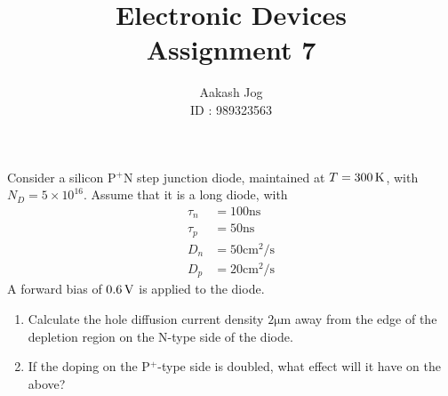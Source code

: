 \documentclass[fleqn, a4paper, 10pt, oneside]{amsart}
\title
[
	Electronic Devices : Assignment 7
]
{
	Electronic Devices\\
	Assignment 7
}
\author
{
	Aakash Jog\\
	ID : 989323563
}
\date{\formatdate{5}{5}{2016}}
\theoremstyle{definition}
\theoremstyle{theorem}
\begin{document}
\maketitle

\begin{question}
	Consider a silicon P$^+$N step junction diode, maintained at $T = 300 \kelvin$, with $N_D = 5 \times 10^{16}$.
	Assume that it is a long diode, with
	\begin{align*}
		\tau_n & = 100 \si{\nano\second}                   \\
		\tau_p & = 50 \si{\nano\second}                    \\
		D_n    & = 50 \si{\centi\metre\squared\per\second} \\
		D_p    & = 20 \si{\centi\metre\squared\per\second}
	\end{align*}
	A forward bias of $0.6 \volt$ is applied to the diode.
	\begin{enumerate}
		\item Calculate the hole diffusion current density $2 \si{\micro\metre}$ away from the edge of the depletion region on the N-type side of the diode.
		\item If the doping on the P$^+$-type side is doubled, what effect will it have on the above?
	\end{enumerate}
\end{question}
\end{document}
